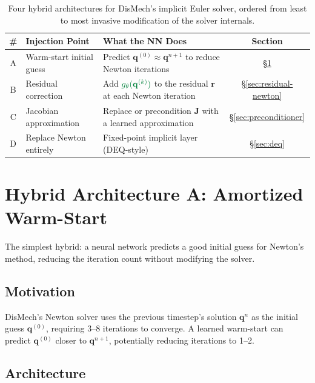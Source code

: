 \documentclass[11pt]{article}
\newcommand{\vect}[1]{\mathbf{#1}}
\newcommand{\mat}[1]{\mathbf{#1}}
\newcommand{\nn}[1]{{\color{nngreen}#1}}
\begin{document}
\begin{table}[H]
  \centering
  \renewcommand{\arraystretch}{1.3}
  \small
  \begin{tabular}{clp{6.5cm}c}
    \toprule
    \# & \textbf{Injection Point} & \textbf{What the NN Does} & \textbf{Section} \\
    \midrule
    A & Warm-start initial guess & Predict $\vect{q}^{(0)} \approx \vect{q}^{n+1}$ to reduce Newton iterations & \S\ref{sec:warmstart} \\
    B & Residual correction & Add $\nn{g_\theta(\vect{q}^{(k)})}$ to the residual $\vect{r}$ at each Newton iteration & \S\ref{sec:residual-newton} \\
    C & Jacobian approximation & Replace or precondition $\mat{J}$ with a learned approximation & \S\ref{sec:preconditioner} \\
    D & Replace Newton entirely & Fixed-point implicit layer (DEQ-style) & \S\ref{sec:deq} \\
    \bottomrule
  \end{tabular}
  \caption{Four hybrid architectures for DisMech's implicit Euler solver, ordered from least to most invasive modification of the solver internals.}
  \label{tab:injection-points}
\end{table}


\section{Hybrid Architecture A: Amortized Warm-Start}
\label{sec:warmstart}

The simplest hybrid: a neural network predicts a good initial guess for Newton's method, reducing the iteration count without modifying the solver.

\subsection{Motivation}

DisMech's Newton solver uses the previous timestep's solution $\vect{q}^n$ as the initial guess $\vect{q}^{(0)}$, requiring 3--8 iterations to converge.
A learned warm-start can predict $\vect{q}^{(0)}$ closer to $\vect{q}^{n+1}$, potentially reducing iterations to 1--2.

\subsection{Architecture}
\end{document}
